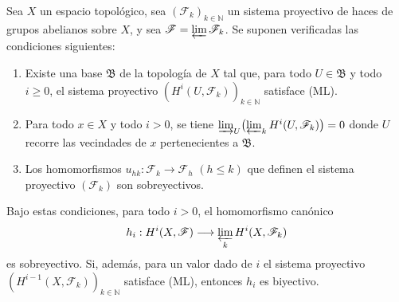 \begin{proposition}[13.3.1]
\label{0.13.3.1}
\label{0.13.3.1-fr}
Sea $X$ un espacio topológico, sea
$(\mathcal F_k)_{k\in\mathbb N}$ un sistema proyectivo de haces de
grupos abelianos sobre $X$, y sea $\mathcal F=\varprojlim\mathcal F_k$.
Se suponen verificadas las condiciones siguientes:
\begin{enumerate}
  \item[{\rm(i)}]
  Existe una base $\mathfrak B$ de la topología de $X$ tal que,
  para todo $U\in\mathfrak B$ y todo $i\geq0$, el sistema
  proyectivo
  $(H^i(U,\mathcal F_k))_{k\in\mathbb N}$ satisface \textup{(ML)}.

  \item[{\rm(ii)}]
  Para todo $x\in X$ y todo $i>0$, se tiene
  $\varinjlim_U\bigl(\varprojlim_k H^i(U,\mathcal F_k)\bigr)=0$
  donde $U$ recorre las vecindades de $x$ pertenecientes a
  $\mathfrak B$.

  \item[{\rm(iii)}]
  Los homomorfismos
  $u_{hk}:\mathcal F_k\to\mathcal F_h$ $(h\leq k)$ que definen el
  sistema proyectivo $(\mathcal F_k)$ son sobreyectivos.
\end{enumerate}
Bajo estas condiciones, para todo $i>0$, el homomorfismo canónico
\[
h_i:H^i(X,\mathcal F)\longrightarrow
\varprojlim_k H^i(X,\mathcal F_k)
\]
es sobreyectivo. Si, además, para un valor dado de $i$ el sistema
proyectivo
$(H^{i-1}(X,\mathcal F_k))_{k\in\mathbb N}$ satisface \textup{(ML)}, entonces $h_i$ es
biyectivo.
\end{proposition}

